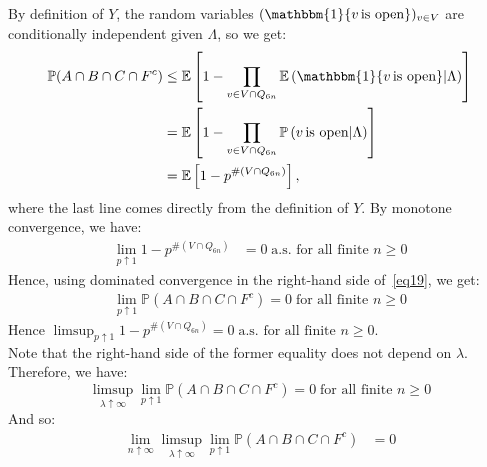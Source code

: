 \documentclass[10pt,a4paper]{amsart}
\theoremstyle{exampstyle}
\theoremstyle{exampnotations}
\begin{document}
By definition of $Y$, the random variables $(\mathbbm{1} \lbrace v \, \text{is open} \rbrace )_{v \in V}$ are conditionally independent given $\Lambda$, so we get:
\begin{align}
    \nonumber \mathbb{P}(A \cap B \cap C \cap F^c) &\leq \mathbb{E}\left[1-\prod_{v \in V \cap Q_{6n}}\mathbb{E}\left( \mathbbm{1}\lbrace v \, \text{is open} \rbrace \vert \Lambda \right)\right]
    \\ \nonumber &= \mathbb{E}\left[1-\prod_{v \in V \cap Q_{6n}}\mathbb{P}\left( v \, \text{is open} \vert \Lambda \right)\right]
    \\ \label{eq19} &= \mathbb{E}\left[1-p^{\#(V \cap Q_{6n})}\right], 
\end{align}
where the last line comes directly from the definition of $Y$. By monotone convergence, we have:
\begin{align*}
  \lim_{p \uparrow 1}1-p^{\#(V \cap Q_{6n})} &= 0 \; \text{a.s. for all finite } n \geq 0
\end{align*}
Hence, using dominated convergence in the right-hand side of~\eqref{eq19}, we get:
\begin{align*}
\lim_{p \uparrow 1} \mathbb{P}(A \cap B \cap C \cap F^c) = 0 \; \text{for all finite } n \geq 0
\end{align*}
Hence $\limsup_{p \uparrow 1}1-p^{\#(V \cap Q_{6n})} = 0 \; \text{a.s. for all finite } n \geq 0$. \\
Note that the right-hand side of the former equality does not depend on $\lambda$. Therefore, we have: \begin{equation*}
    \limsup_{\lambda \uparrow \infty}\lim_{p \uparrow 1} \mathbb{P}(A \cap B \cap C \cap F^c) = 0 \; \text{for all finite } n \geq 0
\end{equation*}
And so:
\begin{align*}
\lim_{n \uparrow \infty}\limsup_{\lambda \uparrow \infty}\lim_{p \uparrow 1} \mathbb{P}(A \cap B \cap C \cap F^c) &=0
\end{align*}
\end{document}
